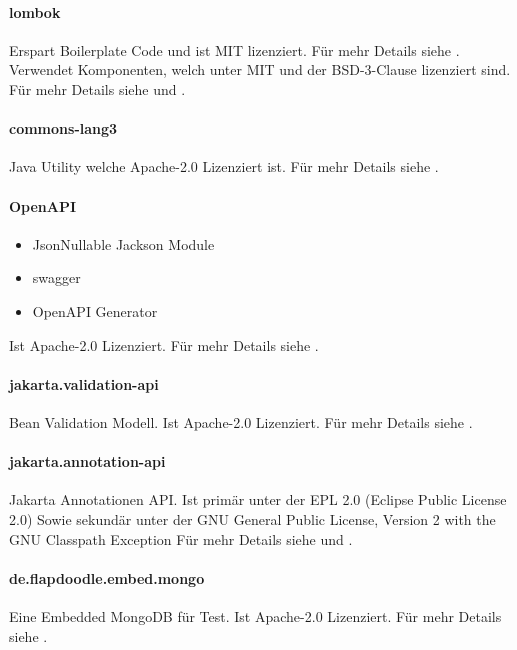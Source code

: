 \paragraph{lombok}
Erspart Boilerplate Code und ist MIT lizenziert.
Für mehr Details siehe .\\
Verwendet Komponenten, welch unter MIT und der BSD-3-Clause lizenziert sind.
Für mehr Details siehe  und .

\paragraph{commons-lang3}
Java Utility welche Apache-2.0 Lizenziert ist.
Für mehr Details siehe .

\paragraph{OpenAPI}
\begin{itemize}
    \item JsonNullable Jackson Module
    \item swagger
    \item OpenAPI Generator
\end{itemize}
Ist Apache-2.0 Lizenziert.
Für mehr Details siehe .

\paragraph{jakarta.validation-api}
Bean Validation Modell.
Ist Apache-2.0 Lizenziert.
Für mehr Details siehe .

\paragraph{jakarta.annotation-api}
Jakarta Annotationen API.
Ist primär unter der EPL 2.0 (Eclipse Public License 2.0)
Sowie sekundär unter der GNU General Public License, Version 2 with the GNU Classpath Exception
Für mehr Details siehe  und .

\paragraph{de.flapdoodle.embed.mongo}
Eine Embedded MongoDB für Test.
Ist Apache-2.0 Lizenziert.
Für mehr Details siehe .

